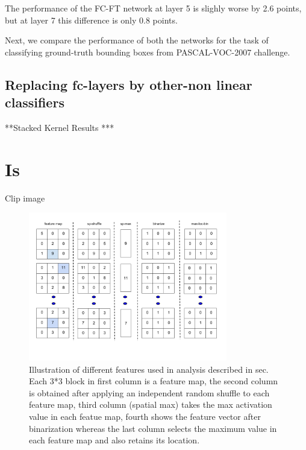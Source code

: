 \documentclass[runningheads]{llncs}
\begin{document}
The performance of the FC-FT network at layer 5 is slighly worse by 2.6 points, but at layer 7 this difference is only 0.8 points. 

Next, we compare the performance of both the networks for the task of classifying ground-truth bounding boxes from PASCAL-VOC-2007 challenge.  

\subsection{Replacing fc-layers by other-non linear classifiers}
**Stacked Kernel Results ***



\section{Is}

\begin{frame}{Clip image}
\begin{figure}[H]
\centering
\includegraphics[height=6.5cm]{images/features.png}
\caption{Illustration of different features used in analysis described in sec. Each 3*3 block in first column is a feature map, the second column is obtained after applying an independent random  shuffle to each feature map, third column (spatial max) takes the max activation value in each featue map, fourth shows the feature vector after binarization whereas the last column selects the maximum value in each feature map and also retains its location. }
\label{fig:features}
\end{figure}
\end{frame}
\end{document}

